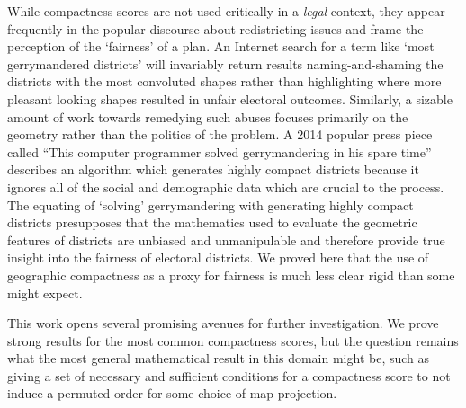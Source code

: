 While compactness scores are not used critically in a \textit{legal} context, they appear frequently in the popular discourse about redistricting issues and frame the perception of the `fairness' of a plan.  An Internet search for a term like `most gerrymandered districts' will invariably return results naming-and-shaming the districts with the most convoluted shapes rather than highlighting where more pleasant looking shapes resulted in unfair electoral outcomes. Similarly, a sizable amount of work towards remedying such abuses focuses primarily on the geometry rather than the politics of the problem. A 2014 popular press piece called ``This computer programmer solved gerrymandering in his spare time'' \cite{ingraham2014solve} describes an algorithm which generates highly compact districts because it ignores all of the social and demographic data which are crucial to the process.  The equating of `solving' gerrymandering with generating highly compact districts presupposes that the mathematics used to evaluate the geometric features of districts are unbiased and unmanipulable and therefore provide true insight into the fairness of electoral districts.  We proved here that the use of geographic compactness as a proxy for fairness is much less clear rigid than some might expect.




This work opens several promising avenues for further investigation.  We prove strong results for the most common compactness scores, but the question remains what the most general mathematical result in this domain might be, such as giving a set of necessary and sufficient conditions for a compactness score to not induce a permuted order for some choice of map projection.  